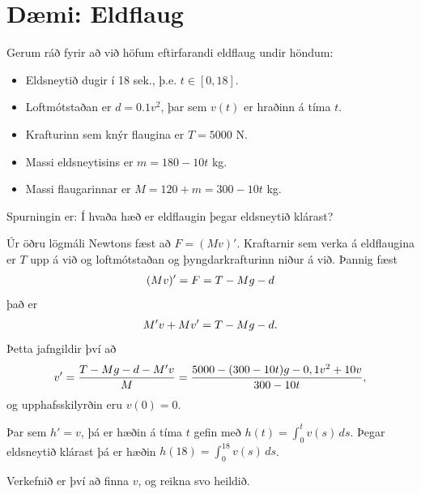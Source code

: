 \documentclass[A4paper,10pt,icelandic]{sphinxmanual}
\begin{document}
\section{Dæmi: Eldflaug}
\label{kafli01:daemi-eldflaug}
Gerum ráð fyrir að við höfum eftirfarandi eldflaug undir höndum:
\begin{itemize}
\item {} 
Eldsneytið dugir í 18 sek., þ.e. \(t\in [0,18]\).

\item {} 
Loftmótstaðan er \(d=0.1v^2\), þar sem \(v(t)\) er hraðinn á tíma \(t\).

\item {} 
Krafturinn sem knýr flaugina er \(T=5000\) N.

\item {} 
Massi eldsneytisins er \(m=180-10t\) kg.

\item {} 
Massi flaugarinnar er \(M = 120 + m = 300 - 10t\) kg.

\end{itemize}

Spurningin er: Í hvaða hæð er eldflaugin þegar eldsneytið klárast?

Úr öðru lögmáli Newtons fæst að \(F = (Mv)'\). Kraftarnir sem verka
á eldflaugina er \(T\) upp á við og loftmótstaðan og
þyngdarkrafturinn niður á við. Þannig fæst
\begin{gather}
\begin{split}(Mv)' = F = T - Mg - d\end{split}\notag
\end{gather}
það er
\begin{gather}
\begin{split}M'v + Mv' = T - Mg -d.\end{split}\notag
\end{gather}
Þetta jafngildir því að
\label{kafli01:eldflaug}\begin{gather}
\begin{split}v' = \frac{T-Mg-d-M'v}{M} = \frac{5000-(300-10t)g-0,1v^2+10v}{300-10t},
\label{eldflaug}\end{split}\notag
\end{gather}
og upphafsskilyrðin eru \(v(0) =0\).

Þar sem \(h' = v\), þá er hæðin á tíma \(t\) gefin með
\(h(t) =\int_0^t v(s)\, ds\). Þegar eldsneytið klárast þá er hæðin
\(h(18) = \int_0^{18} v(s)\, ds\).

Verkefnið er því að finna \(v\), og reikna svo heildið.
\end{document}
